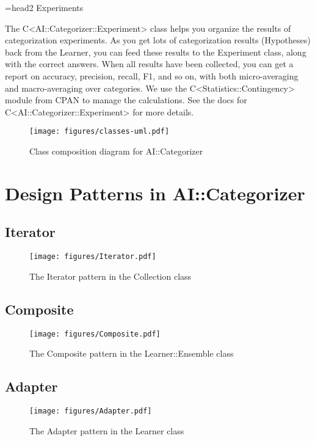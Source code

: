 \documentclass[a4paper]{report}
\begin{document}
=head2 Experiments

The C<AI::Categorizer::Experiment> class helps you organize the
results of categorization experiments.  As you get lots of
categorization results (Hypotheses) back from the Learner, you can
feed these results to the Experiment class, along with the correct
answers.  When all results have been collected, you can get a report
on accuracy, precision, recall, F1, and so on, with both
micro-averaging and macro-averaging over categories.  We use the
C<Statistics::Contingency> module from CPAN to manage the
calculations. See the docs for C<AI::Categorizer::Experiment> for more
details.



\begin{figure}
\texttt{[image: figures/classes-uml.pdf]}
\caption{Class composition diagram for AI::Categorizer}
\label{classes-uml}
\end{figure}

\section{Design Patterns in AI::Categorizer}

\subsection{Iterator}
\begin{figure}
\texttt{[image: figures/Iterator.pdf]}
\caption{The Iterator pattern in the Collection class}
\label{Iterator-collection}
\end{figure}

\subsection{Composite}
\begin{figure}
\texttt{[image: figures/Composite.pdf]}
\caption{The Composite pattern in the Learner::Ensemble class}
\label{Composite-ensemble}
\end{figure}

\subsection{Adapter}
\begin{figure}
\texttt{[image: figures/Adapter.pdf]}
\caption{The Adapter pattern in the Learner class}
\label{Adapter-learner}
\end{figure}
\end{document}

